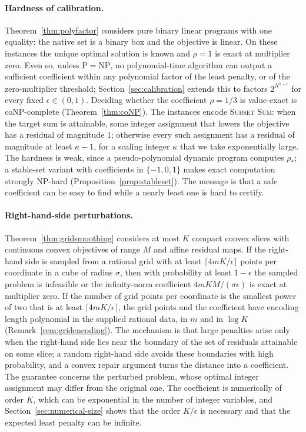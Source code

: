 \paragraph{Hardness of calibration.}
Theorem~\ref{thm:polyfactor} considers pure binary linear programs with
one equality: the native set is a binary box and the objective is
linear. On these instances the unique optimal solution is known and
$\rho=1$ is exact at multiplier zero. Even so, unless
$\mathrm P=\mathrm{NP}$, no polynomial-time algorithm can output a
sufficient coefficient within any polynomial factor of the least
penalty, or of the zero-multiplier threshold; Section~\ref{sec:calibration}
extends this to factors $2^{N^{1-\epsilon}}$ for every fixed
$\epsilon\in(0,1)$. Deciding whether the
coefficient $\rho=1/3$ is value-exact is coNP-complete
(Theorem~\ref{thm:coNP}). The instances encode \textsc{Subset Sum}: when the target sum is
attainable, some integer assignment that lowers the objective has a
residual of magnitude $1$; otherwise every such assignment has a residual
of magnitude at least $\kappa-1$, for a scaling integer $\kappa$ that we
take exponentially large. The hardness is weak, since a pseudo-polynomial
dynamic program computes $\rho_*$; a stable-set variant with
coefficients in $\{-1,0,1\}$ makes exact computation strongly NP-hard
(Proposition~\ref{prop:stableset}). The message is that a safe
coefficient can be easy to find while a nearly least one is hard to
certify.

\paragraph{Right-hand-side perturbations.}
Theorem~\ref{thm:gridsmoothing} considers at most $K$ compact convex
slices with continuous convex objectives of range $M$ and affine
residual maps. If the right-hand side is sampled from a rational grid
with at least $\lceil4mK/\epsilon\rceil$ points per coordinate in a cube
of radius $\sigma$, then with probability at least $1-\epsilon$ the
sampled problem is infeasible or the infinity-norm coefficient
$4mKM/(\sigma\epsilon)$ is exact at multiplier zero. If the number of grid points per coordinate is the smallest power of
two that is at least $\lceil4mK/\epsilon\rceil$, the grid points and the
coefficient have encoding length polynomial in the supplied rational
data, in $m$ and in $\log K$ (Remark~\ref{rem:gridencoding}). The mechanism is that
large penalties arise only when the right-hand side lies near the
boundary of the set of residuals attainable on some slice; a random
right-hand side avoids these boundaries with high probability, and a
convex repair argument turns the distance into a coefficient. The
guarantee concerns the perturbed problem, whose optimal integer
assignment may differ from the original one. The coefficient is
numerically of order $K$, which can be exponential in the number of
integer variables, and Section~\ref{sec:numerical-size} shows that the
order $K/\epsilon$ is necessary and that the expected least penalty can
be infinite.

